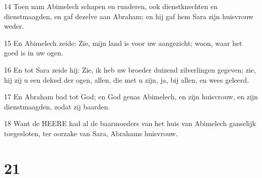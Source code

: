 \par 14 Toen nam Abimelech schapen en runderen, ook dienstknechten en dienstmaagden, en gaf dezelve aan Abraham; en hij gaf hem Sara zijn huisvrouw weder.
\par 15 En Abimelech zeide: Zie, mijn land is voor uw aangezicht; woon, waar het goed is in uw ogen.
\par 16 En tot Sara zeide hij: Zie, ik heb uw broeder duizend zilverlingen gegeven; zie, hij zij u een deksel der ogen, allen, die met u zijn, ja, bij allen, en wees geleerd.
\par 17 En Abraham bad tot God; en God genas Abimelech, en zijn huisvrouw, en zijn dienstmaagden, zodat zij baarden.
\par 18 Want de HEERE had al de baarmoeders van het huis van Abimelech ganselijk toegesloten, ter oorzake van Sara, Abrahams huisvrouw.

\chapter{21}

